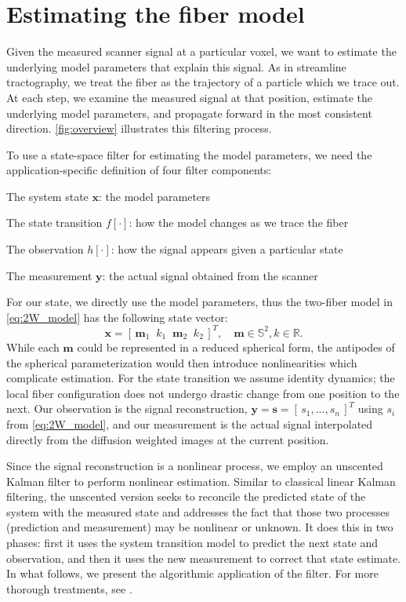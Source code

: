 \documentclass[final,hyperref]{gatech-thesis}
\renewcommand{\v}[1]{\ensuremath{\mathbf #1}\xspace}
\newcommand{\rv}[1]{\ensuremath{[\, #1 \,]}\xspace} %
\newcommand{\R}{\ensuremath{\mathbb R}}
\renewcommand{\S}{\ensuremath{\mathbb S}}
\newcommand{\s}{\v s}
\newcommand{\m}{\v m}
\newcommand{\x}{\v x}
\newcommand{\y}{\v y}
\begin{document}
\section{Estimating the fiber model} \label{sec:estimation}

Given the measured scanner signal at a particular voxel, we want to estimate
the underlying model parameters that explain this signal.  As in streamline
tractography, we treat the fiber as the trajectory of a particle which we
trace out.  At each step, we examine the measured signal at that position,
estimate the underlying model parameters, and propagate forward in the most
consistent direction.  \autoref{fig:overview} illustrates this filtering
process.

To use a state-space filter for estimating the model parameters, we need the
application-specific definition of four filter components:
\begin{enumerate*}
\item The system state \x: the model parameters
\item The state transition $f[\cdot]$: how the model changes as we trace the fiber
\item The observation $h[\cdot]$: how the signal appears given a particular state
\item The measurement \y: the actual signal obtained from the scanner
\end{enumerate*}
For our state, we directly use the model parameters, thus the two-fiber model
in \autoref{eq:2W_model} has the following state vector:
\begin{equation} \label{eq:state}
  \x = \rv{\m_1 \;\; k_1 \;\; \m_2 \;\; k_2 }^T,
  \quad
  \m \in \S^2, k \in \R .
\end{equation}
While each $\m$ could be represented in a reduced spherical form, the
antipodes of the spherical parameterization would then introduce
nonlinearities which complicate estimation.
%
For the state transition we assume identity dynamics; the local fiber
configuration does not undergo drastic change from one position to the next.
Our observation is the signal reconstruction, $\y=\s=\rv{s_1,...,s_n}^T$ using
$s_i$ from \autoref{eq:2W_model}, and our measurement is the actual signal
interpolated directly from the diffusion weighted images at the current
position.

Since the signal reconstruction is a nonlinear process, we employ an unscented
Kalman filter to perform nonlinear estimation.  Similar to classical linear
Kalman filtering, the unscented version seeks to reconcile the predicted state
of the system with the measured state and addresses the fact that those two
processes (prediction and measurement) may be nonlinear or unknown.  It does
this in two phases:  first it uses the system transition model to predict the
next state and observation, and then it uses the new measurement to correct
that state estimate.  In what follows, we present the algorithmic application
of the filter.  For more thorough treatments, see \cite{Julier2004,Merwe2003}.
\end{document}
